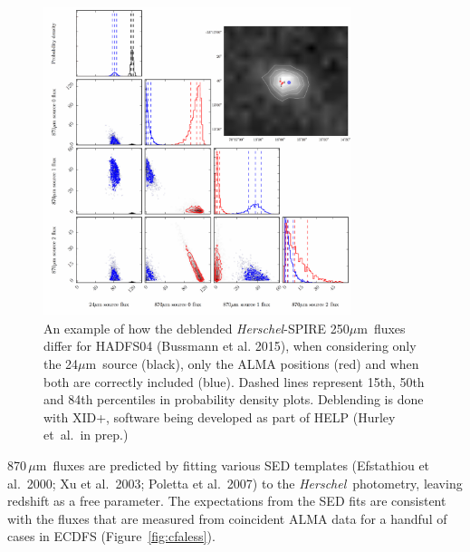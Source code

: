 \documentclass[12pt,a4paper]{article}
\newcommand{\herschel}{{\it Herschel}}
\newcommand{\ea}{et~al.}
\newcommand{\micron}{$\mu$m}
\begin{document}
\begin{figure}
\centering\includegraphics[width=9cm]{250XID+beta_ADFS04_merged_edit.pdf} 
\caption{An example of how the deblended \herschel-SPIRE 250\micron\ fluxes differ for HADFS04 (Bussmann et al. 2015), when considering only the 24\micron\ source (black), only the ALMA positions (red) and when both are correctly included (blue). Dashed lines represent 15th, 50th and 84th percentiles in probability density plots. Deblending is done with XID+, software being developed as part of HELP (Hurley \ea\  in prep.)}
\label{fig:triplots}
\end{figure}

870\,\micron\ fluxes are predicted by fitting various SED
templates (Efstathiou et al.\ 2000; Xu et al.\
2003; Poletta et al.\ 2007) to the \herschel\ photometry, leaving
redshift as a free parameter. The expectations from the SED fits are
consistent with the fluxes that are measured from coincident ALMA data for a handful of cases
in ECDFS (Figure~\ref{fig:cfaless}). 
\end{document}
